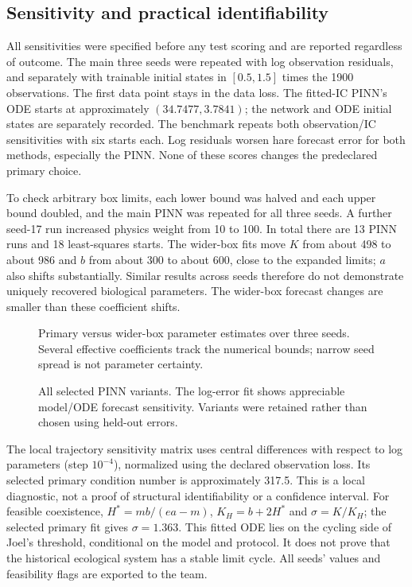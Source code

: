 \subsection{Sensitivity and practical identifiability}
All sensitivities were specified before any test scoring and are reported regardless
of outcome. The main three seeds were repeated with log observation residuals, and
separately with trainable initial states in $[0.5,1.5]$ times the 1900 observations. The
first data point stays in the data loss. The fitted-IC PINN's ODE starts at approximately
$(34.7477,3.7841)$; the network and ODE initial states are separately recorded. The benchmark
repeats both observation/IC sensitivities with six starts each. Log residuals worsen hare
forecast error for both methods, especially the PINN. None of these scores changes the
predeclared primary choice.

To check arbitrary box limits, each lower bound was halved and each upper bound doubled,
and the main PINN was repeated for all three seeds. A further seed-17 run increased physics
weight from 10 to 100. In total there are 13 PINN runs and 18 least-squares starts.
The wider-box fits move $K$ from about 498 to about 986 and $b$ from about 300 to about 600,
close to the expanded limits; $a$ also shifts substantially. Similar results across seeds
therefore do not demonstrate uniquely recovered biological parameters. The wider-box
forecast changes are smaller than these coefficient shifts.
\begin{figure}[htbp]\centering
{}
\caption{Primary versus wider-box parameter estimates over three seeds. Several effective
coefficients track the numerical bounds; narrow seed spread is not parameter certainty.}
\end{figure}
\begin{figure}[htbp]\centering
{}
\caption{All selected PINN variants. The log-error fit shows appreciable model/ODE forecast
sensitivity. Variants were retained rather than chosen using held-out errors.}
\end{figure}

\clearpage
The local trajectory sensitivity matrix uses central differences with respect to log
parameters (step $10^{-4}$), normalized using the declared observation loss. Its selected
primary condition number is approximately 317.5. This is a local diagnostic, not
a proof of structural identifiability or a confidence interval. For feasible coexistence,
$H^*=mb/(ea-m)$, $K_H=b+2H^*$ and $\sigma=K/K_H$; the selected primary fit gives
$\sigma=1.363$. This fitted ODE lies on the cycling side of Joel's threshold, conditional
on the model and protocol. It does not prove that the historical ecological system has
a stable limit cycle. All seeds' values and feasibility flags are exported to the team.

